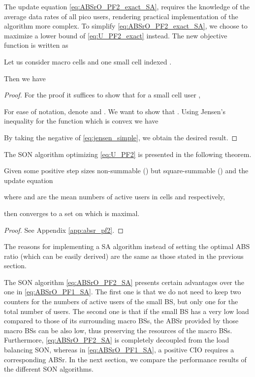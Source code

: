\documentclass[conference]{IEEEtran}
\begin{document}
	The update equation \eqref{eq:ABSrO_PF2_exact_SA}, requires the knowledge of the average data rates of all pico users, rendering practical implementation of the algorithm more complex. To simplify \eqref{eq:ABSrO_PF2_exact_SA}, we choose to maximize a lower bound of \eqref{eq:U_PF2_exact} instead. The new objective function is written as


\begin{lemma}
	Let us consider  macro cells and one small cell indexed .

	Then  we have

\end{lemma}
\begin{proof}
	For the proof it suffices to show that for a small cell user ,
	
	For ease of notation, denote  and . We want to show that . Using Jensen's inequality \cite{jensen1906fonctions} for the function  which is convex we have
	
	By taking the negative of \eqref{eq:jensen_simple}, we obtain the desired result.
\end{proof}
	The \ac{SON} algorithm optimizing \eqref{eq:U_PF2} is presented in the following theorem.
	
\begin{theorem} \label{th:absr_pf2}
	Given some positive step sizes  non-summable () but square-summable () and the update equation
	
	where  and  are the mean numbers of active users in cells  and  respectively,
	
	then  converges to a set on which  is maximal.
\end{theorem}
\begin{proof}
	See Appendix \ref{app:absr_pf2}.
\end{proof}
	
	The reasons for implementing a \ac{SA} algorithm instead of setting the optimal \ac{ABS} ratio (which can be easily derived) are the same as those stated in the previous section.
	
	The \ac{SON} algorithm \eqref{eq:ABSrO_PF2_SA} presents certain advantages over the one in \eqref{eq:ABSrO_PF1_SA}. The first one is that we do not need to keep two counters for the numbers of active users of the small \ac{BS}, but only one for the total number of users. The second one is that if the small \ac{BS} has a very low load compared to those of its surrounding macro \acp{BS}, the \ac{ABSr} provided by those macro \acp{BS} can be also low, thus preserving the resources of the macro \acp{BS}. Furthermore, \eqref{eq:ABSrO_PF2_SA} is completely decoupled from the load balancing \ac{SON}, whereas in \eqref{eq:ABSrO_PF1_SA}, a positive \ac{CIO} requires a corresponding \ac{ABSr}. In the next section, we compare the performance results of the different \ac{SON} algorithms.
\end{document}
